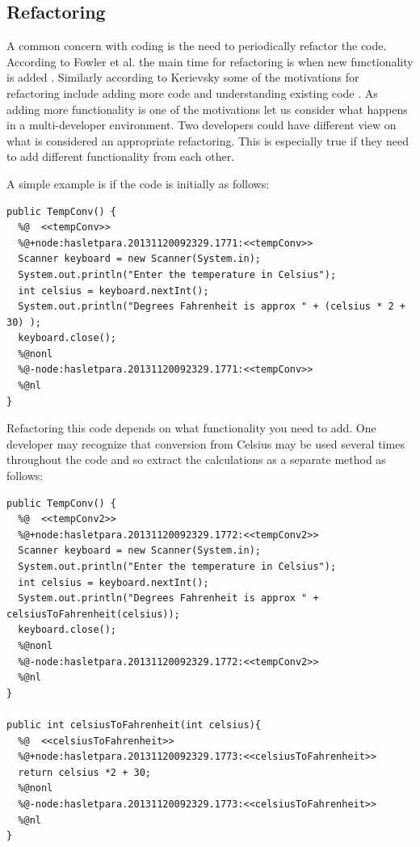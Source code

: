 \documentclass[12pt]{CRPITStyle}
\renewcommand{\cite}{\citep}
\begin{document}
\subsection{Refactoring}
A common concern with coding is the need to periodically refactor the code. According to Fowler et al. the main time for refactoring is when new functionality is added \cite{Fowler1999}. Similarly according to Kerievsky some of the motivations for refactoring include adding more code and understanding existing code \cite{Kerievsky2004}. As adding more functionality is one of the motivations let us consider what happens in a multi-developer environment. Two developers could have different view on what is considered an appropriate refactoring. This is especially true if they need to add different functionality from each other. 


A simple example is if the code is initially as follows:
\begin{verbatim}
public TempConv() {
  %@  <<tempConv>>
  %@+node:hasletpara.20131120092329.1771:<<tempConv>>
  Scanner keyboard = new Scanner(System.in);
  System.out.println("Enter the temperature in Celsius");
  int celsius = keyboard.nextInt();
  System.out.println("Degrees Fahrenheit is approx " + (celsius * 2 + 30) );
  keyboard.close();
  %@nonl
  %@-node:hasletpara.20131120092329.1771:<<tempConv>>
  %@nl
}
\end{verbatim}

Refactoring this code depends on what functionality you need to add. One developer may recognize that conversion from Celsius may be used several times throughout the code and so extract the calculations as a separate method as follows:

\begin{verbatim}
public TempConv() {
  %@  <<tempConv2>>
  %@+node:hasletpara.20131120092329.1772:<<tempConv2>>
  Scanner keyboard = new Scanner(System.in);
  System.out.println("Enter the temperature in Celsius");
  int celsius = keyboard.nextInt();
  System.out.println("Degrees Fahrenheit is approx " + celsiusToFahrenheit(celsius));
  keyboard.close();
  %@nonl
  %@-node:hasletpara.20131120092329.1772:<<tempConv2>>
  %@nl
}

public int celsiusToFahrenheit(int celsius){
  %@  <<celsiusToFahrenheit>>
  %@+node:hasletpara.20131120092329.1773:<<celsiusToFahrenheit>>
  return celsius *2 + 30;
  %@nonl
  %@-node:hasletpara.20131120092329.1773:<<celsiusToFahrenheit>>
  %@nl
}
\end{verbatim}
\end{document}
